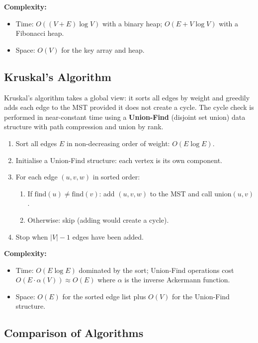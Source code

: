 \documentclass[12pt]{article}
\begin{document}
\textbf{Complexity:}
\begin{itemize}
  \item Time: $O((V + E)\log V)$ with a binary heap; $O(E + V\log V)$ with a Fibonacci heap.
  \item Space: $O(V)$ for the key array and heap.
\end{itemize}

\subsection*{Kruskal's Algorithm}

\hspace{0.8cm} Kruskal's algorithm takes a global view: it sorts all edges by weight
and greedily adds each edge to the MST provided it does not create a cycle. The
cycle check is performed in near-constant time using a \textbf{Union-Find} (disjoint
set union) data structure with path compression and union by rank.

\begin{enumerate}
  \item Sort all edges $E$ in non-decreasing order of weight: $O(E \log E)$.
  \item Initialise a Union-Find structure: each vertex is its own component.
  \item For each edge $(u, v, w)$ in sorted order:
  \begin{enumerate}
    \item If $\text{find}(u) \neq \text{find}(v)$: add $(u, v, w)$ to the MST and call $\text{union}(u, v)$.
    \item Otherwise: skip (adding would create a cycle).
  \end{enumerate}
  \item Stop when $|V| - 1$ edges have been added.
\end{enumerate}

\textbf{Complexity:}
\begin{itemize}
  \item Time: $O(E \log E)$ dominated by the sort; Union-Find operations cost
        $O(E \cdot \alpha(V)) \approx O(E)$ where $\alpha$ is the inverse Ackermann function.
  \item Space: $O(E)$ for the sorted edge list plus $O(V)$ for the Union-Find structure.
\end{itemize}

\subsection*{Comparison of Algorithms}
\end{document}
